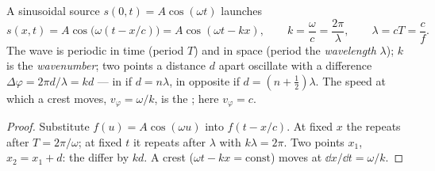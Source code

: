 \begin{proposition}\label{prop:b1:wave-propagation:sinusoidal}
A sinusoidal source $s(0, t) = A\cos(\omega t)$ launches
\[
s(x, t) = A\cos\!\big(\omega(t - x/c)\big) = A\cos(\omega t - kx),
\qquad k = \frac{\omega}{c} = \frac{2\pi}{\lambda},
\qquad \lambda = cT = \frac{c}{f}.
\]
The wave is periodic in time (period $T$) and in space (period the
\emph{wavelength} $\lambda$); $k$ is the \emph{wavenumber}; two points
a distance $d$ apart oscillate with a  difference
$\Delta\varphi = 2\pi d/\lambda = kd$ --- in  if $d = n\lambda$, in
opposite  if $d = (n + \tfrac12)\lambda$. The speed at which a
crest moves, $v_\varphi = \omega/k$, is the \emph{};
here $v_\varphi = c$.
\end{proposition}

\begin{proof}
Substitute $f(u) = A\cos(\omega u)$ into $f(t - x/c)$. At fixed $x$ the
 repeats after $T = 2\pi/\omega$; at fixed $t$ it repeats after
$\lambda$ with $k\lambda = 2\pi$. Two points $x_1$, $x_2 = x_1 + d$: the
 differ by $kd$. A crest ($\omega t - kx = \text{const}$) moves at
$\dd x/\dd t = \omega/k$.
\end{proof}

